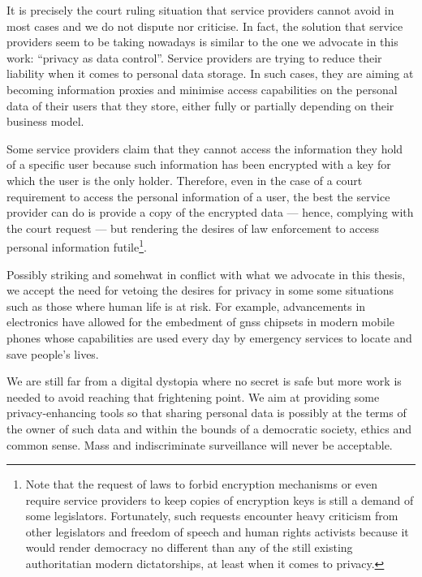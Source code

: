 It is precisely the court ruling situation that service providers cannot avoid in 
most cases and we do not dispute nor criticise. In fact, the solution that service 
providers seem to be taking nowadays is similar to the one we advocate in this 
work: ``privacy as data control''. Service providers are trying to reduce their 
liability when it comes to personal data storage. In such cases, they are aiming  
at becoming information proxies and minimise access capabilities on the personal 
data of their users that they store, either fully or partially depending on their 
business model.

Some service providers claim that they cannot access the information they hold of 
a specific user because such information has been encrypted with a key for which 
the user is the only holder. Therefore, even in the case of a court requirement 
to access the personal information of a user, the best the service provider can 
do is provide a copy of the encrypted data --- hence, complying with the court request 
--- but rendering the desires of law enforcement to access personal information 
futile\footnote{Note that the request of laws to forbid encryption mechanisms or even require 
service providers to keep copies of encryption keys is still a demand of some legislators. 
Fortunately, such requests encounter heavy criticism from other legislators and 
freedom of speech and human rights activists because it would render democracy no 
different than any of the still existing authoritatian modern dictatorships, at 
least when it comes to privacy.}. 

Possibly striking and somehwat in conflict with what we advocate in this thesis, 
we accept the need for vetoing the desires for privacy in some some situations such 
as those where human life is at risk. For example, advancements in electronics have 
allowed for the embedment of \ac{gnss} chipsets in modern mobile phones whose capabilities 
are used every day by emergency services to locate and save people's lives.

We are still far from a digital dystopia where no secret is safe but more work is 
needed to avoid reaching that frightening point. We aim at providing some privacy-enhancing
tools so that sharing personal data is possibly at the terms of the owner of such 
data and within the bounds of a democratic society, ethics and common sense. Mass 
and indiscriminate surveillance will never be acceptable.

